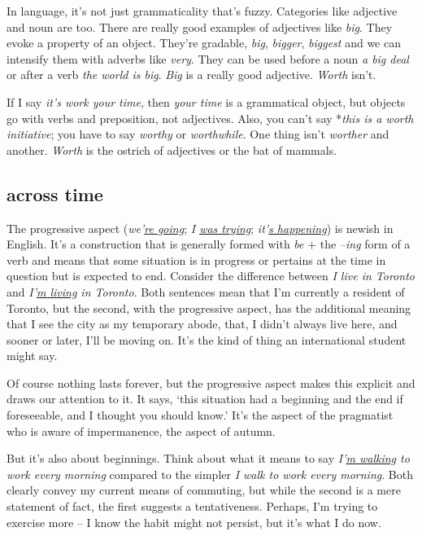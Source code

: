 In language, it's not just grammaticality that's fuzzy. Categories like adjective and noun are too. There are really good examples of adjectives like \textit{big}. They evoke a property of an object. They're gradable, \textit{big}, \textit{bigger}, \textit{biggest} and we can intensify them with adverbs like \textit{very}. They can be used before a noun \textit{a big deal} or after a verb \textit{the world is big}. \textit{Big} is a really good adjective. \textit{Worth} isn't.

If I say \textit{it's work your time}, then \textit{your time} is a grammatical object, but objects go with verbs and preposition, not adjectives. Also, you can't say *\textit{this is a worth initiative}; you have to say \textit{worthy} or \textit{worthwhile}. One thing isn't \textit{worther} and another. \textit{Worth} is the ostrich of adjectives or the bat of mammals.

\subsection{across time}

The progressive aspect (\textit{we'\uline{re going}}; \textit{I \uline{was trying}}; \textit{it'\uline{s happening}}) is newish in English. It's a construction that is generally formed with \textit{be} + the \textit{--ing} form of a verb and means that some situation is in progress or pertains at the time in question but is expected to end. Consider the difference between \textit{I live in Toronto} and \textit{I'\uline{m living} in Toronto}. Both sentences mean that I'm currently a resident of Toronto, but the second, with the progressive aspect, has the additional meaning that I see the city as my temporary abode, that, I didn't always live here, and sooner or later, I'll be moving on. It's the kind of thing an international student might say.

Of course nothing lasts forever, but the progressive aspect makes this explicit and draws our attention to it. It says, `this situation had a beginning and the end if foreseeable, and I thought you should know.' It's the aspect of the pragmatist who is aware of impermanence, the aspect of autumn.

But it's also about beginnings. Think about what it means to say \textit{I'\uline{m walking} to work every morning} compared to the simpler \textit{I walk to work every morning}. Both clearly convey my current means of commuting, but while the second is a mere statement of fact, the first suggests a tentativeness. Perhaps, I'm trying to exercise more -- I know the habit might not persist, but it's what I do now.

